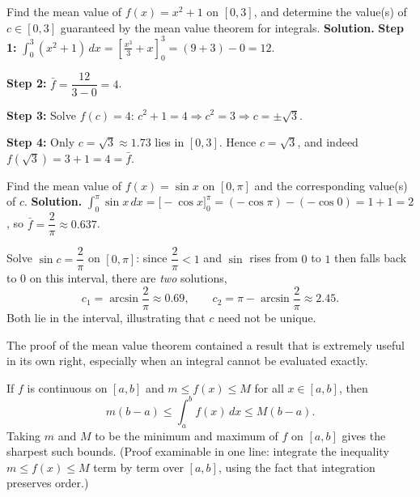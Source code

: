 \documentclass[11pt]{article}
\newcounter{popsec}
\newcounter{popsub}
\newcommand{\courssub}[1]{%
  \stepcounter{popsub}%
  \par\vspace{9pt}\noindent{\popxbold\fontsize{11.5}{13}\selectfont\color{popink}{\color{poporange}\thepopsec.\thepopsub}\hspace{6pt}#1}\par\nopagebreak\vspace{4pt}
}
\begin{document}
\begin{exoresolu}
Find the mean value of $f(x) = x^2 + 1$ on $[0,3]$, and determine the value(s) of $c \in [0,3]$ guaranteed by the mean value theorem for integrals.
\tcblower
\textbf{Solution.}
\textbf{Step 1:} $\displaystyle \int_0^3 (x^2+1)\,dx = \left[\frac{x^3}{3}+x\right]_0^3 = (9+3) - 0 = 12$.

\textbf{Step 2:} $\bar{f} = \dfrac{12}{3-0} = 4$.

\textbf{Step 3:} Solve $f(c)=4$: $c^2+1=4 \Rightarrow c^2=3 \Rightarrow c=\pm\sqrt{3}$.

\textbf{Step 4:} Only $c=\sqrt{3}\approx 1.73$ lies in $[0,3]$. Hence $c=\sqrt{3}$, and indeed $f(\sqrt{3})=3+1=4=\bar{f}$.
\end{exoresolu}

\begin{exoresolu}
Find the mean value of $f(x)=\sin x$ on $\left[0,\pi\right]$ and the corresponding value(s) of $c$.
\tcblower
\textbf{Solution.}
$\displaystyle\int_0^{\pi} \sin x\,dx = \big[-\cos x\big]_0^{\pi} = (-\cos\pi) - (-\cos 0) = 1+1 = 2$, so $\bar{f} = \dfrac{2}{\pi} \approx 0.637$.

Solve $\sin c = \dfrac{2}{\pi}$ on $[0,\pi]$: since $\dfrac{2}{\pi}<1$ and $\sin$ rises from $0$ to $1$ then falls back to $0$ on this interval, there are \emph{two} solutions,
\[
c_1 = \arcsin\frac{2}{\pi} \approx 0.69, \qquad c_2 = \pi - \arcsin\frac{2}{\pi} \approx 2.45 .
\]
Both lie in the interval, illustrating that $c$ need not be unique.
\end{exoresolu}

\courssub{Bounding an Integral}

The proof of the mean value theorem contained a result that is extremely useful in its own right, especially when an integral cannot be evaluated exactly.

\begin{propriete}
If $f$ is continuous on $[a,b]$ and $m \le f(x) \le M$ for all $x\in[a,b]$, then
\[
m(b-a) \le \int_a^b f(x)\,dx \le M(b-a) .
\]
Taking $m$ and $M$ to be the minimum and maximum of $f$ on $[a,b]$ gives the sharpest such bounds. (Proof examinable in one line: integrate the inequality $m\le f(x)\le M$ term by term over $[a,b]$, using the fact that integration preserves order.)
\end{propriete}
\end{document}
